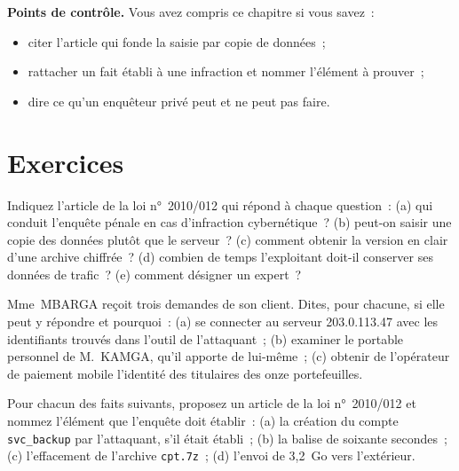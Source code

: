 \begin{boxinfo}
\textbf{Points de contrôle.} Vous avez compris ce chapitre si vous savez~:
\begin{itemize}
    \item citer l'article qui fonde la saisie par copie de données~;
    \item rattacher un fait établi à une infraction et nommer l'élément à
          prouver~;
    \item dire ce qu'un enquêteur privé peut et ne peut pas faire.
\end{itemize}
\end{boxinfo}

\section*{Exercices}

\begin{boxexo}[title={\ding{45}\quad Exercice~8.1. Quel texte~? \niveaubase}]
Indiquez l'article de la loi n°~2010/012 qui répond à chaque question~:
(a) qui conduit l'enquête pénale en cas d'infraction cybernétique~?
(b) peut-on saisir une copie des données plutôt que le serveur~? (c) comment
obtenir la version en clair d'une archive chiffrée~? (d) combien de temps
l'exploitant doit-il conserver ses données de trafic~? (e) comment désigner
un expert~?
\end{boxexo}

\begin{boxexo}[title={\ding{45}\quad Exercice~8.2. Ce que l'enquêteur privé ne fait pas \niveaumoyen}]
Mme~MBARGA reçoit trois demandes de son client. Dites, pour chacune, si elle
peut y répondre et pourquoi~: (a) se connecter au serveur 203.0.113.47 avec
les identifiants trouvés dans l'outil de l'attaquant~; (b) examiner le
portable personnel de M.~KAMGA, qu'il apporte de lui-même~; (c) obtenir de
l'opérateur de paiement mobile l'identité des titulaires des onze
portefeuilles.
\end{boxexo}

\begin{boxexo}[title={\ding{45}\quad Exercice~8.3. Qualifier \niveaumoyen}]
Pour chacun des faits suivants, proposez un article de la loi n°~2010/012
et nommez l'élément que l'enquête doit établir~: (a) la création du compte
\texttt{svc\_backup} par l'attaquant, s'il était établi~; (b) la balise de
soixante secondes~; (c) l'effacement de l'archive \texttt{cpt.7z}~;
(d) l'envoi de 3,2~Go vers l'extérieur.
\end{boxexo}

